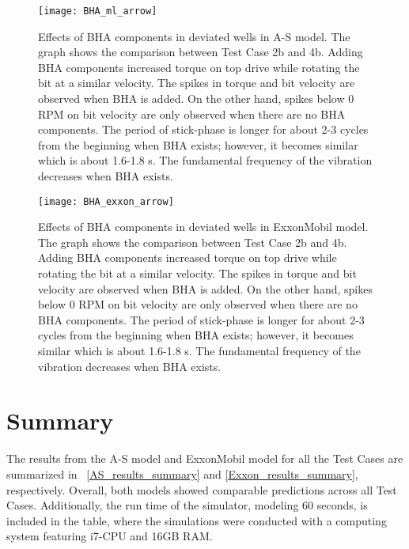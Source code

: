 \begin{figure}
  \centering
  \texttt{[image: BHA\_ml\_arrow]}
  \caption[Effects of BHA components (MATLAB model)]{Effects of BHA components in deviated wells in A-S model. The graph shows the comparison between Test Case 2b and 4b. Adding BHA components increased torque on top drive while rotating the bit at a similar velocity. The spikes in torque and bit velocity are observed when BHA is added. On the other hand, spikes below 0 RPM on bit velocity are only observed when there are no BHA components. The period of stick-phase is longer for about 2-3 cycles from the beginning when BHA exists; however, it becomes similar which is about 1.6-1.8 s. The fundamental frequency of the vibration decreases when BHA exists.}\label{figure_BHA_MATLAB}
\end{figure}

\begin{figure}
  \centering
  \texttt{[image: BHA\_exxon\_arrow]}
  \caption[Effects of BHA components (ExxonMobil model)]{Effects of BHA components in deviated wells in ExxonMobil model. The graph shows the comparison between Test Case 2b and 4b. Adding BHA components increased torque on top drive while rotating the bit at a similar velocity. The spikes in torque and bit velocity are observed when BHA is added. On the other hand, spikes below 0 RPM on bit velocity are only observed when there are no BHA components. The period of stick-phase is longer for about 2-3 cycles from the beginning when BHA exists; however, it becomes similar which is about 1.6-1.8 s. The fundamental frequency of the vibration decreases when BHA exists.}\label{figure_BHA_EXXON}
\end{figure}

\section{Summary} 
The results from the A-S model and ExxonMobil model for all the Test Cases are summarized in \tablename~\ref{AS_results_summary} and \ref{Exxon_results_summary}, respectively. Overall, both models showed comparable predictions across all Test Cases. Additionally, the run time of the simulator, modeling 60 seconds, is included in the table, where the simulations were conducted with a computing system featuring i7-CPU and 16GB RAM. 

